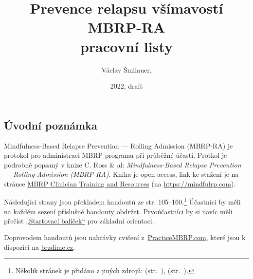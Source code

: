 \documentclass[11pt,a5paper,twoside]{article}
\title{\ifplastex\else\vskip-2cm\fi Prevence relapsu všímavostí\\ MBRP-RA \\ pracovní listy}
\date{2022, draft}
\author{Václav Šmilauer, \lessstressLogo}
\begin{document}
	\maketitle

	\subsection*{Úvodní poznámka}
		Mindfulness-Based Relapse Prevention — Rolling Admission (MBRP-RA) je protokol pro administraci MBRP programu při průběžné účasti. Protkol je podrobně popsaný v knize C. Ross \& al: \emph{Mindfulness-Based Relapse Prevention — Rolling Admission (MBRP-RA)}. Kniha je open-access, link ke stažení je na stránce \href{https://mindfulrp.com/for-clinicians}{MBRP Clinician Training and Resources} (na \url{https://mindfulrp.com}).

		Následující strany jsou překladem handoutů ze str. 105–160.\footnote{Několik stránek je přidáno z jiných zdrojů:
			 (str.~\pageref{slovni-zasoba-pocity}),
			 (str.~\pageref{slovni-zasoba-potreby}).
		} Účastníci by měli na každém sezení příslušné handouty obdržet. Prvoúčastníci by si navíc měli přečíst \href{https://brzdime.cz/start}{„Startovací balíček“} pro základní orientaci.

		Doprovodem handoutů jsou nahrávky cvičení z~\href{https://practicembrp.com}{PracticeMBRP.com}, které jsou k dispozici na \href{https://brzdime.cz}{brzdime.cz}.

	\setlength{\cftbeforesecskip}{1ex}

	\clearpage
	\tableofcontents
	
\end{document}
